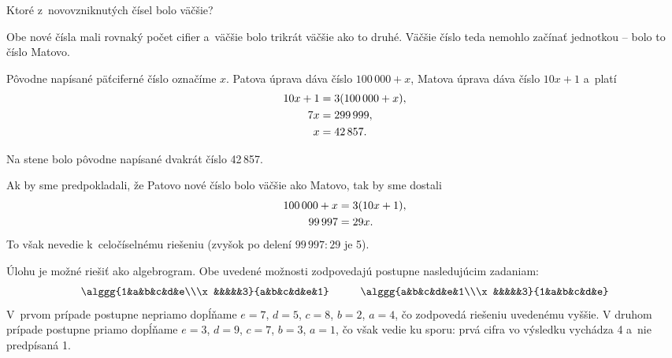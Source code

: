 {%
\napad
Ktoré z~novovzniknutých čísel bolo väčšie?

\riesenie
Obe nové čísla mali rovnaký počet cifier a~väčšie bolo trikrát väčšie ako to druhé.
Väčšie číslo teda nemohlo začínať jednotkou -- bolo to číslo Matovo.

Pôvodne napísané päťciferné číslo označíme $x$.
Patova úprava dáva číslo $100\,000+x$, Matova úprava dáva číslo $10x+1$
a~platí
$$\aligned
10x+1&=3(100\,000+x), \\
7x&=299\,999, \\
x&=42\,857.
\endaligned
$$

Na stene bolo pôvodne napísané dvakrát číslo 42\,857.

\poznamky
Ak by sme predpokladali, že Patovo nové číslo bolo väčšie ako Matovo, tak by sme dostali
$$\aligned
100\,000+x&=3(10x+1), \\
99\,997&=29 x.
\endaligned
$$
To však nevedie k~celočíselnému riešeniu (zvyšok po delení $99\,997:29$ je 5).

Úlohu je možné riešiť ako algebrogram.
Obe uvedené možnosti zodpovedajú postupne nasledujúcim zadaniam:
$$
\alggg{1&a&b&c&d&e\\\x&&&&&3}{a&b&c&d&e&1}
\hskip1cm
\alggg{a&b&c&d&e&1\\\x&&&&&3}{1&a&b&c&d&e}
$$
V~prvom prípade postupne nepriamo dopĺňame $e=7$, $d=5$, $c=8$, $b=2$, $a=4$, čo zodpovedá riešeniu uvedenému vyššie.
V druhom prípade postupne priamo dopĺňame $e=3$, $d=9$, $c=7$, $b=3$, $a=1$, čo však vedie ku sporu: prvá cifra vo výsledku vychádza 4 a~nie predpísaná 1.
}

